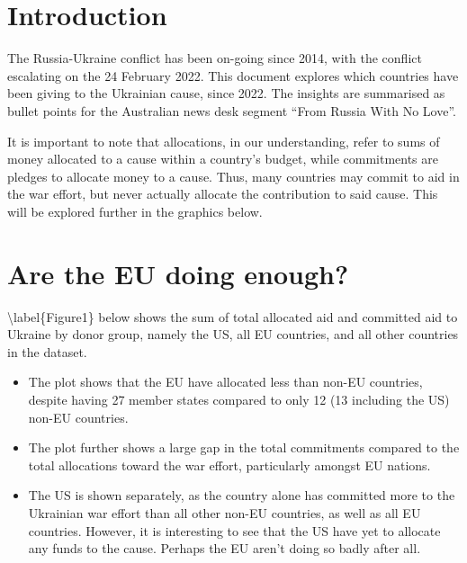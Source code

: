 \documentclass[11pt,preprint, authoryear]{elsarticle}
\numberwithin{equation}{section}
\numberwithin{figure}{section}
\numberwithin{table}{section}
\begin{document}
\headsep 35pt %




\hypertarget{introduction}{%
\section{\texorpdfstring{Introduction
\label{Introduction}}{Introduction }}\label{introduction}}

The Russia-Ukraine conflict has been on-going since 2014, with the
conflict escalating on the 24 February 2022. This document explores
which countries have been giving to the Ukrainian cause, since 2022. The
insights are summarised as bullet points for the Australian news desk
segment ``From Russia With No Love''.

It is important to note that allocations, in our understanding, refer to
sums of money allocated to a cause within a country's budget, while
commitments are pledges to allocate money to a cause. Thus, many
countries may commit to aid in the war effort, but never actually
allocate the contribution to said cause. This will be explored further
in the graphics below.

\hypertarget{are-the-eu-doing-enough}{%
\section{\texorpdfstring{Are the EU doing enough?
\label{EU}}{Are the EU doing enough? }}\label{are-the-eu-doing-enough}}

\textbackslash label\{Figure1\} below shows the sum of total allocated
aid and committed aid to Ukraine by donor group, namely the US, all EU
countries, and all other countries in the dataset.

\begin{itemize}
\item
  The plot shows that the EU have allocated less than non-EU countries,
  despite having 27 member states compared to only 12 (13 including the
  US) non-EU countries.
\item
  The plot further shows a large gap in the total commitments compared
  to the total allocations toward the war effort, particularly amongst
  EU nations.
\item
  The US is shown separately, as the country alone has committed more to
  the Ukrainian war effort than all other non-EU countries, as well as
  all EU countries. However, it is interesting to see that the US have
  yet to allocate any funds to the cause. Perhaps the EU aren't doing so
  badly after all.
\end{itemize}
\end{document}
